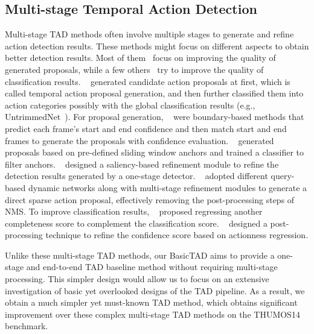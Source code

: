 \documentclass[a4paper,fleqn]{cas-dc}
\begin{document}
\subsection{Multi-stage Temporal Action Detection}
Multi-stage TAD methods often involve multiple stages to generate and refine action detection results. These methods might focus on different aspects to obtain better detection results. Most of them~\citep{bsn,bmn,bsn++,g-tad,bcgnn,DCAN} focus on improving the quality of generated proposals, while a few others~\citep{TADTR,ssn} try to improve the quality of classification results. ~\citep{bsn,bmn,bsn++,g-tad,bcgnn, DCAN,turn,rapnet,talnet,r-c3d} generated candidate action proposals at first, which is called temporal action proposal generation, and then further classified them into action categories possibly with the global classification results (e.g., UntrimmedNet~\citep{untrimmednet}). For proposal generation, ~\cite{bsn,bmn,bsn++,g-tad,bcgnn, DCAN} were boundary-based methods that predict each frame's start and end confidence and then match start and end frames to generate the proposals with confidence evaluation.  ~\citep{turn,rapnet,talnet,r-c3d} generated proposals based on pre-defined sliding window anchors and trained a classifier to filter anchors. ~\citep{afsd} designed a saliency-based refinement module to refine the detection results generated by a one-stage detector. ~\cite{sparse-rcnn-tad, TADTR,rtd} adopted different query-based dynamic networks along with multi-stage refinement modules to generate a direct sparse action proposal, effectively removing the post-processing steps of NMS. To improve classification results, ~\cite{ssn} proposed regressing another completeness score to complement the classification score. ~\cite{TADTR} designed a post-processing technique to refine the confidence score based on actionness regression.

Unlike these multi-stage TAD methods, our BasicTAD aims to provide a one-stage and end-to-end TAD baseline method without requiring multi-stage processing. This simpler design would allow us to focus on an extensive investigation of basic yet overlooked designs of the TAD pipeline. As a result, we obtain a much simpler yet must-known TAD method, which obtains significant improvement over these complex multi-stage TAD methods on the THUMOS14 benchmark.
\end{document}
